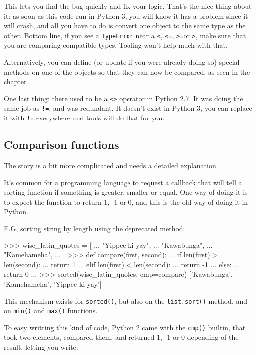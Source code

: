 This lets you find the bug quickly and fix your logic. That's the nice thing about it: as soon as this code run in Python 3, you will know it has a problem since it will crash, and all you have to do is convert one object to the same type as the other. Bottom line, if you see a \lstinline{TypeError} near a \lstinline{<}, \lstinline{<=}, \lstinline{>=}or \lstinline{>}, make sure that you are comparing compatible types. Tooling won't help much with that.

Alternatively, you can define (or update if you were already doing so) special methods on one of the objects so that they can now be compared, as seen in the chapter .

One last thing: there used to be a \lstinline{<>} operator in Python 2.7. It was doing the same job as \lstinline{!=}, and was redundant. It doesn't exist in Python 3, you can replace it with \lstinline{!=} everywhere and tools will do that for you.

\subsection{Comparison functions}

The story is a bit more complicated and needs a detailed explanation.

It's common for a programming language to request a callback that will tell a sorting function if something is greater, smaller or equal. One way of doing it is to expect the function to return 1, -1 or 0, and this is the old way of doing it in Python.

E.G, sorting string by length using the deprecated method:

\begin{py2}
>>> wise_latin_quotes = [
...     "Yippee ki-yay",
...     "Kawabunga",
...     "Kamehameha",
... ]
>>> def compare(first, second):
...     if len(first) > len(second):
...         return 1
...     elif len(first) < len(second):
...         return -1
...     else:
...         return 0
...
>>> sorted(wise_latin_quotes, cmp=compare)
['Kawabunga', 'Kamehameha', 'Yippee ki-yay']
\end{py2}

This mechanism exists for \lstinline{sorted()}, but also on the \lstinline{list.sort()} method, and on \lstinline{min()} and \lstinline{max()} functions.

To easy writting this kind of code, Python 2 came with the \lstinline{cmp()} \gls{builtin}, that took two elements, compared them, and returned 1, -1 or 0 depending of the result, letting you write:

